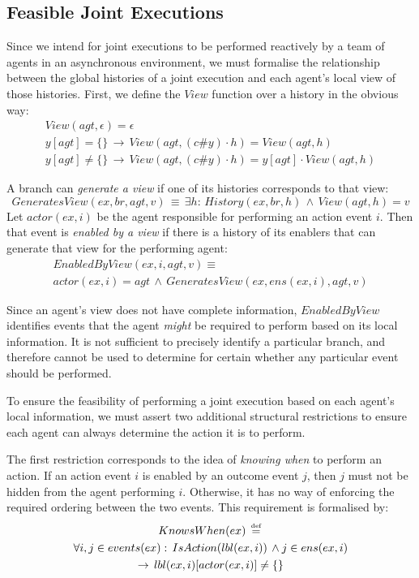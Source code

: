 \subsection{Feasible Joint Executions}

Since we intend for joint executions to be performed reactively by
a team of agents in an asynchronous environment, we must formalise
the relationship between the global histories of a joint execution
and each agent's local view of those histories. First, we define the
$View$ function over a history in the obvious way:\begin{gather*}
View(agt,\epsilon)=\epsilon\\
y[agt]=\{\}\,\rightarrow\, View(agt,(c\#y)\cdot h)=View(agt,h)\\
y[agt]\neq\{\}\,\rightarrow\, View(agt,(c\#y)\cdot h)=y[agt]\cdot View(agt,h)\end{gather*}


A branch can \emph{generate a view} if one of its histories corresponds
to that view:\[
GeneratesView(ex,br,agt,v)\,\equiv\,\exists h:\, History(ex,br,h)\,\wedge\, View(agt,h)=v\]
 Let $actor(ex,i)$ be the agent responsible for performing an action
event $i$. Then that event is \emph{enabled by a view} if there is
a history of its enablers that can generate that view for the performing
agent:\begin{multline*}
EnabledByView(ex,i,agt,v)\equiv\\
actor(ex,i)=agt\,\wedge\, GeneratesView(ex,ens(ex,i),agt,v)\end{multline*}


Since an agent's view does not have complete information, $EnabledByView$
identifies events that the agent \emph{might} be required to perform
based on its local information. It is not sufficient to precisely
identify a particular branch, and therefore cannot be used to determine
for certain whether any particular event should be performed.

To ensure the feasibility of performing a joint execution based on
each agent's local information, we must assert two additional structural
restrictions to ensure each agent can always determine the action
it is to perform.

The first restriction corresponds to the idea of \emph{knowing when}
to perform an action. If an action event $i$ is enabled by an outcome
event $j$, then $j$ must not be hidden from the agent performing
$i$. Otherwise, it has no way of enforcing the required ordering
between the two events. This requirement is formalised by:\begin{multline*}
KnowsWhen(ex)\,\stackrel{\mbox{\tiny def}}{=}\,\\
\forall i,j\in events(ex):\, IsAction(lbl(ex,i))\,\wedge j\in ens(ex,i)\\
\rightarrow\, lbl(ex,i)[actor(ex,i)]\neq\{\}\end{multline*}


